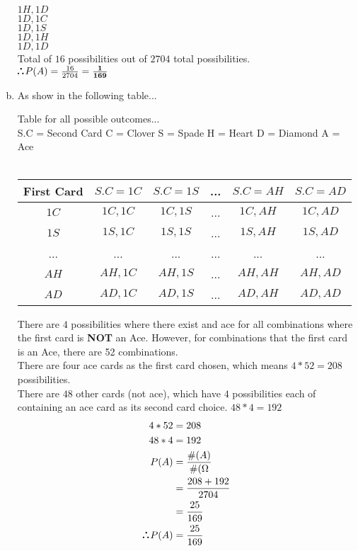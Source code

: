 \documentclass[10pt]{report}
\def\therefore{\boldsymbol{\text{ }
\leavevmode
\lower0.4ex\hbox{$\cdot$}
\kern-.5em\raise0.7ex\hbox{$\cdot$}
\kern-0.6em\lower0.4ex\hbox{$\cdot$}
\thinspace\text{ }}}
\begin{document}
\begin{enumerate}[(a)]
\begin{center}
 $1H, 1D $ \\
 $1D, 1C $ \\
 $1D, 1S $ \\
 $1D, 1H $ \\
 $1D, 1D $ \\
 Total of $16 $ possibilities out of $2704 $ total possibilities. \\
$ \therefore P(A) = \frac{16}{2704} = \mathbf{\frac{1}{169}} $
 \end{center}
 \item As show in the following table...
 \begin{center}
 Table for all possible outcomes... \\
 \footnotesize{ S.C = Second Card }
 \footnotesize{ C = Clover }
 \footnotesize{ S = Spade}
 \footnotesize{ H = Heart}
 \footnotesize{ D = Diamond} 
 \footnotesize{ A = Ace } \\ 
 \ \\
 \begin{tabular}{ |c|c|c|c|c|c| }
 \hline
First Card &  $S.C = 1C$ & $S.C = 1S$ & ... & $S.C = AH$ & $S.C = AD$ \\
\hline
$1C$ & $1C, 1C$ & $1C, 1S$ & ... & $1C, AH$ & $1C, AD$  \\
\hline
$1S$ & $1S, 1C $ & $1S, 1S$ & ... & $1S, AH$ & $1S, AD $ \\
\hline
... & ... & ... & ... & ... & ... \\
\hline
$AH$ & $AH, 1C$ & $AH, 1S$ & ... & $AH, AH$ & $AH, AD $ \\
\hline
$AD$ & $AD, 1C$ & $AD, 1S$ & ... & $AD, AH$ & $AD, AD$ \\
\hline
 \end{tabular}
 \end{center}
 There are $4 $ possibilities where there exist and ace for all combinations where the first card is \textbf{NOT} an Ace. However, for combinations that the first card is an Ace, there are 52 combinations. \\
 There are four ace cards as the first card chosen, which means $4 * 52 = 208 $ possibilities.\\
 There are $48$ other cards (not ace), which have $4 $ possibilities each of containing an ace card as its second card choice. $48 * 4 = 192 $
 \begin{align*}
 4*52 &= 208 \\
 48*4 &= 192 \\
 P(A) &= \frac{\#(A)}{\#(\Omega} \\
 &= \frac{208+192}{2704} \\
 &= \frac{25}{169} \\
 \therefore P(A) & = \frac{25}{169} \\
 \end{align*}
 \end{enumerate}
\setcounter{section}{2}
\end{document}
